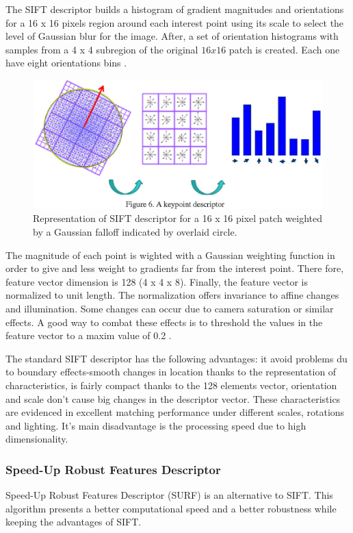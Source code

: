 \documentclass[9pt,shortpaper,twoside,web]{ieeecolor}
\begin{document}
The SIFT descriptor builds a histogram of gradient magnitudes and orientations for a 16 x 16 pixels region around each interest point using its scale to select the level of Gaussian blur for the image. After, a set of orientation histograms with samples from a 4 x 4 subregion of the original $16 x 16$ patch is created. Each one have eight orientations bins \cite{b4}.

\begin{figure}[htb]
\includegraphics[width=\columnwidth]{res/fig/SIFT.png}
\caption{Representation of SIFT descriptor for a 16 x 16 pixel patch weighted by a Gaussian falloff indicated by overlaid circle.}
\label{fig4}
\end{figure}

The magnitude of each point is wighted with a Gaussian weighting function in order to give  and less weight to gradients far from the interest point. There fore, feature vector dimension is 128 (4 x 4 x 8). Finally, the feature vector is normalized to unit length. The normalization offers invariance to affine changes and illumination. Some changes can occur due to camera saturation or similar effects. A good way to combat these effects is to threshold the values in the feature vector to a maxim value of 0.2 \cite{b3}.

The standard  SIFT descriptor has the following advantages: it avoid problems du to boundary effects-smooth changes in location thanks to the representation of characteristics, is fairly compact thanks to the 128 elements vector, orientation and scale don't cause big changes in the descriptor vector. These characteristics are evidenced in excellent matching performance under different scales, rotations and lighting. It's main disadvantage is the processing speed due to high dimensionality.
\\

\subsubsection{Speed-Up Robust Features Descriptor}
Speed-Up Robust Features Descriptor (SURF) is an alternative to SIFT. This algorithm presents a better computational speed and a better robustness while keeping the advantages of SIFT.
\end{document}
